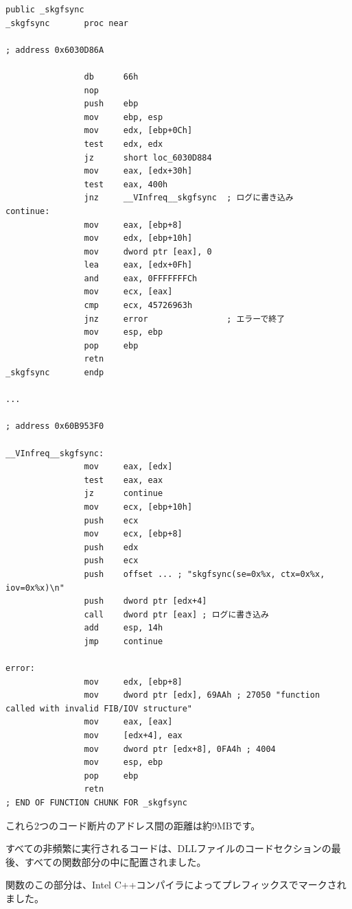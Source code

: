 \begin{lstlisting}[caption=orageneric11.dll (win32),style=customasmx86]
                public _skgfsync
_skgfsync       proc near

; address 0x6030D86A

                db      66h
                nop
                push    ebp
                mov     ebp, esp
                mov     edx, [ebp+0Ch]
                test    edx, edx
                jz      short loc_6030D884
                mov     eax, [edx+30h]
                test    eax, 400h
                jnz     __VInfreq__skgfsync  ; ログに書き込み
continue:
                mov     eax, [ebp+8]
                mov     edx, [ebp+10h]
                mov     dword ptr [eax], 0
                lea     eax, [edx+0Fh]
                and     eax, 0FFFFFFFCh
                mov     ecx, [eax]
                cmp     ecx, 45726963h
                jnz     error                ; エラーで終了
                mov     esp, ebp
                pop     ebp
                retn
_skgfsync       endp

...

; address 0x60B953F0

__VInfreq__skgfsync:
                mov     eax, [edx]
                test    eax, eax
                jz      continue
                mov     ecx, [ebp+10h]
                push    ecx
                mov     ecx, [ebp+8]
                push    edx
                push    ecx
                push    offset ... ; "skgfsync(se=0x%x, ctx=0x%x, iov=0x%x)\n"
                push    dword ptr [edx+4]
                call    dword ptr [eax] ; ログに書き込み
                add     esp, 14h
                jmp     continue

error:
                mov     edx, [ebp+8]
                mov     dword ptr [edx], 69AAh ; 27050 "function called with invalid FIB/IOV structure"
                mov     eax, [eax]
                mov     [edx+4], eax
                mov     dword ptr [edx+8], 0FA4h ; 4004
                mov     esp, ebp
                pop     ebp
                retn
; END OF FUNCTION CHUNK FOR _skgfsync
\end{lstlisting}

これら2つのコード断片のアドレス間の距離は約9MBです。

すべての非頻繁に実行されるコードは、DLLファイルのコードセクションの最後、すべての関数部分の中に配置されました。

関数のこの部分は、Intel C++コンパイラによってプレフィックスでマークされました。

